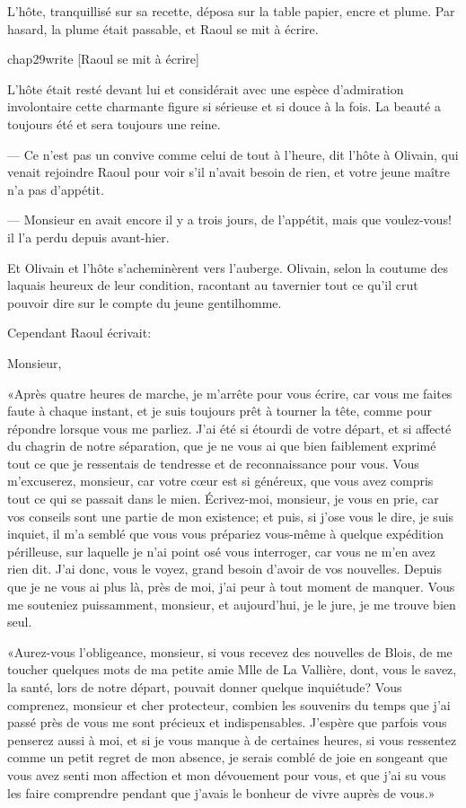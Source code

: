 L'hôte, tranquillisé sur sa recette, déposa sur la table papier, encre et plume. Par hasard, la plume était passable, et Raoul se mit à écrire.

\begin{bwbigpic}
	[\basicscale] 
	{chap29write}
	[Raoul se mit à écrire]
\end{bwbigpic}

L'hôte était resté devant lui et considérait avec une espèce d'admiration involontaire cette charmante figure si sérieuse et si douce à la fois. La beauté a toujours été et sera toujours une reine.

— Ce n'est pas un convive comme celui de tout à l'heure, dit l'hôte à Olivain, qui venait rejoindre Raoul pour voir s'il n'avait besoin de rien, et votre jeune maître n'a pas d'appétit.

— Monsieur en avait encore il y a trois jours, de l'appétit, mais que voulez-vous! il l'a perdu depuis avant-hier.

Et Olivain et l'hôte s'acheminèrent vers l'auberge. Olivain, selon la coutume des laquais heureux de leur condition, racontant au tavernier tout ce qu'il crut pouvoir dire sur le compte du jeune gentilhomme.

Cependant Raoul écrivait:

Monsieur,

«Après quatre heures de marche, je m'arrête pour vous écrire, car vous me faites faute à chaque instant, et je suis toujours prêt à tourner la tête, comme pour répondre lorsque vous me parliez. J'ai été si étourdi de votre départ, et si affecté du chagrin de notre séparation, que je ne vous ai que bien faiblement exprimé tout ce que je ressentais de tendresse et de reconnaissance pour vous. Vous m'excuserez, monsieur, car votre cœur est si généreux, que vous avez compris tout ce qui se passait dans le mien. Écrivez-moi, monsieur, je vous en prie, car vos conseils sont une partie de mon existence; et puis, si j'ose vous le dire, je suis inquiet, il m'a semblé que vous vous prépariez vous-même à quelque expédition périlleuse, sur laquelle je n'ai point osé vous interroger, car vous ne m'en avez rien dit. J'ai donc, vous le voyez, grand besoin d'avoir de vos nouvelles. Depuis que je ne vous ai plus là, près de moi, j'ai peur à tout moment de manquer. Vous me souteniez puissamment, monsieur, et aujourd'hui, je le jure, je me trouve bien seul.

«Aurez-vous l'obligeance, monsieur, si vous recevez des nouvelles de Blois, de me toucher quelques mots de ma petite amie Mlle de La Vallière, dont, vous le savez, la santé, lors de notre départ, pouvait donner quelque inquiétude? Vous comprenez, monsieur et cher protecteur, combien les souvenirs du temps que j'ai passé près de vous me sont précieux et indispensables. J'espère que parfois vous penserez aussi à moi, et si je vous manque à de certaines heures, si vous ressentez comme un petit regret de mon absence, je serais comblé de joie en songeant que vous avez senti mon affection et mon dévouement pour vous, et que j'ai su vous les faire comprendre pendant que j'avais le bonheur de vivre auprès de vous.»

